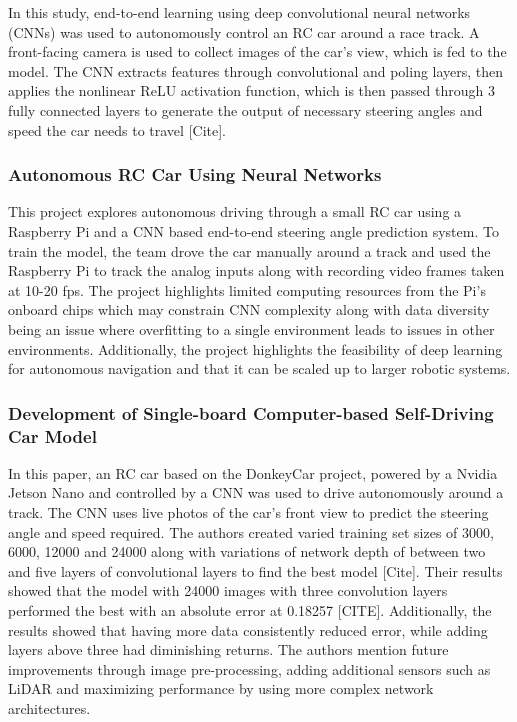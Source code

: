\documentclass{article} %
\begin{document}
 
In this study, end-to-end learning using deep convolutional neural networks (CNNs) was used to autonomously control an RC car around a race track. 
A front-facing camera is used to collect images of the car’s view, which is fed to the model. The CNN extracts features through convolutional and poling layers, 
then applies the nonlinear ReLU activation function, which is then passed through 3 fully connected layers to generate the output of necessary steering angles 
and speed the car needs to travel [Cite].

\subsubsection{Autonomous RC Car Using Neural Networks}

This project explores autonomous driving through a small RC car using a Raspberry Pi and a CNN based end-to-end steering angle prediction system. 
To train the model, the team drove the car manually around a track and used the Raspberry Pi to track the analog inputs along with recording video frames 
taken at 10-20 fps. The project highlights limited computing resources from the Pi’s onboard chips which may constrain CNN complexity along with data 
diversity being an issue where overfitting to a single environment leads to issues in other environments. Additionally, the project highlights the 
feasibility of deep learning for autonomous navigation and that it can be scaled up to larger robotic systems.

\subsubsection{Development of Single-board Computer-based Self-Driving Car Model}

In this paper, an RC car based on the DonkeyCar project, powered by a Nvidia Jetson Nano and controlled by a CNN was used to drive autonomously around a track. The
CNN uses live photos of the car’s front view to predict the steering angle and speed required. The authors created varied training set sizes of 
3000, 6000, 12000 and 24000 along with variations of network depth of between two and five layers of convolutional layers to find the best model [Cite]. 
Their results showed that the model with 24000 images with three convolution layers performed the best with an absolute error at 0.18257 [CITE]. 
Additionally, the results showed that having more data consistently reduced error, while adding layers above three had diminishing returns. 
The authors mention future improvements through image pre-processing, adding additional sensors such as LiDAR and maximizing performance 
by using more complex network architectures.
\end{document}
